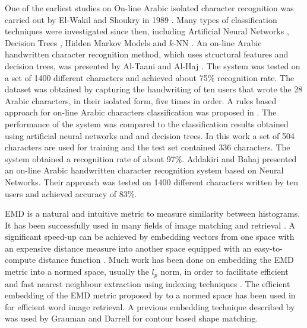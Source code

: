 \documentclass[10pt, conference, compsocconf]{IEEEtran}
\begin{document}
One of the earliest studies on On-line Arabic isolated character recognition was carried out by El-Wakil and Shoukry in 1989 \cite{el1989line}.
Many types of classification techniques were investigated since then, including Artificial Neural Networks \cite{alijla2012oiahcr,ismail2012online}, Decision Trees \cite{ismail2012online, al2010recognition, omer2010online}, Hidden Markov Models \cite{biadsy2006online} and $k$-NN \cite{elglaly2011isolated}.
An on-line Arabic handwritten character recognition method, which uses structural features and decision trees, was presented by Al-Taani and Al-Haj \cite{al2010recognition}. 
The system was tested on a set of 1400 different characters and achieved about 75\% recognition rate. 
The dataset was obtained by capturing the handwriting of ten users that wrote the 28 Arabic characters, in their isolated form, five times in order.
A rules based approach for on-line Arabic characters classification was proposed in \cite{ismail1859online}. 
The performance of the system was compared to the classification results obtained using  artificial neural networks and and decision trees. 
In this work a set of 504 characters are used for training and the test set contained 336 characters. 
The system obtained a recognition rate of about 97\%. 
Addakiri and Bahaj \cite{addakiri2012line} presented an on-line Arabic handwritten character
recognition system based on Neural Networks. 
Their approach was tested on 1400 different characters written by ten users and achieved accuracy of 83\%.

EMD is a natural and intuitive metric to measure similarity between histograms. 
It has been successfully used in many fields of image matching and retrieval \cite{grauman2004fast, rubner2000earth}.
A significant speed-up can be achieved by embedding vectors from one space with an expensive distance measure into another space equipped with an easy-to-compute distance function \cite{saabni2013efficient}. 
Much work has been done on embedding the EMD metric into a normed space, usually the $l_p$ norm, in order to facilitate efficient and fast nearest neighbour extraction using indexing techniques \cite{bourgain1985lipschitz}. 
The efficient embedding of the EMD metric proposed by  \cite{shirdhonkar2008approximate} to a normed space has been used in \cite{saabni2013efficient} for efficient word image retrieval.
A previous embedding technique described by \cite{indyk2003fast} was used by Grauman and Darrell \cite{grauman2004fast} for contour based shape matching.
\end{document}
